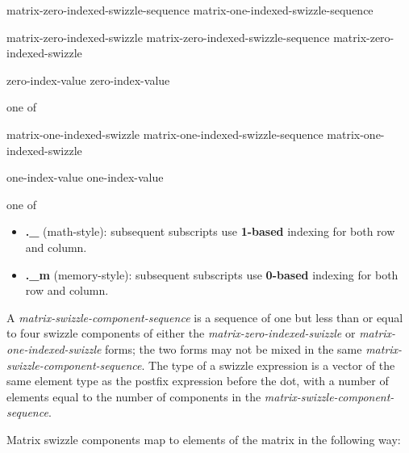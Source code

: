 \begin{grammar}
  \br
  matrix-zero-indexed-swizzle-sequence\br
  matrix-one-indexed-swizzle-sequence\br

  \br
  matrix-zero-indexed-swizzle\br
  matrix-zero-indexed-swizzle-sequence matrix-zero-indexed-swizzle\br

  \br
   zero-index-value zero-index-value\br

   \textnormal{one of}\br
  \br

  \br
  matrix-one-indexed-swizzle\br
  matrix-one-indexed-swizzle-sequence matrix-one-indexed-swizzle\br

  \br
  \terminal{\_} one-index-value one-index-value\br

   \textnormal{one of}\br
  \br
\end{grammar}

\begin{itemize}
\item \textbf{.\_} (math-style): subsequent subscripts use \textbf{1-based}
 indexing for both row and column.
\item \textbf{.\_m} (memory-style): subsequent subscripts use \textbf{0-based}
 indexing for both row and column.
\end{itemize}

\p A \textit{matrix-swizzle-component-sequence} is a sequence of one but less
than or equal to four swizzle components of either the
\textit{matrix-zero-indexed-swizzle} or \textit{matrix-one-indexed-swizzle}
forms; the two forms may not be mixed in the same
\textit{matrix-swizzle-component-sequence}. The type of a swizzle expression is
a vector of the same element type as the postfix expression before the dot,
with a number of elements equal to the number of components in the
\textit{matrix-swizzle-component-sequence}.

\p Matrix swizzle components map to elements of the matrix in the following way:

